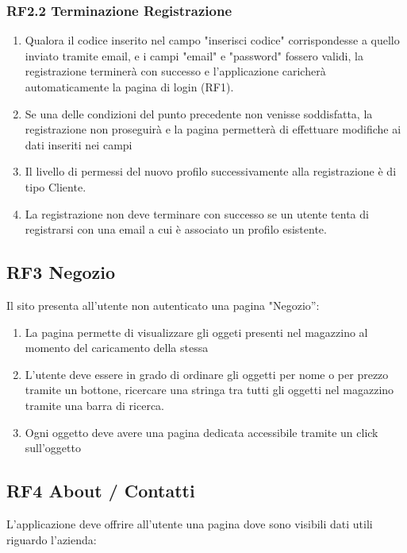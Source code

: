 \documentclass{report}
\begin{document}
\subsubsection*{RF2.2 Terminazione Registrazione}
\begin{enumerate}
	\item Qualora il codice inserito nel campo "inserisci codice" corrispondesse a quello inviato tramite email, e i campi "email" e "password" fossero validi, la registrazione terminerà con successo e l'applicazione caricherà automaticamente la pagina di login (RF1).
	\item Se una delle condizioni del punto precedente non venisse soddisfatta, la registrazione non proseguirà e la pagina permetterà di effettuare modifiche ai dati inseriti nei campi
	\item Il livello di permessi del nuovo profilo successivamente alla registrazione è di tipo Cliente.
	\item La registrazione non deve terminare con successo se un utente tenta di registrarsi con una email a cui è associato un profilo esistente.

\end{enumerate}


\subsection*{RF3 Negozio}
Il sito presenta all’utente non autenticato una pagina "Negozio”: 

\begin{enumerate}
	\item La pagina permette di visualizzare gli oggeti presenti nel magazzino al momento del caricamento della stessa
	
	\item L’utente deve essere in grado di ordinare gli oggetti per nome o per prezzo tramite un bottone, ricercare una stringa tra tutti gli oggetti nel magazzino tramite una barra di ricerca.
	
	\item Ogni oggetto deve avere una pagina dedicata accessibile tramite un click sull’oggetto
\end{enumerate}


\subsection*{RF4 About / Contatti}
L’applicazione deve offrire all’utente una pagina dove sono visibili dati utili riguardo l'azienda:
\end{document}
